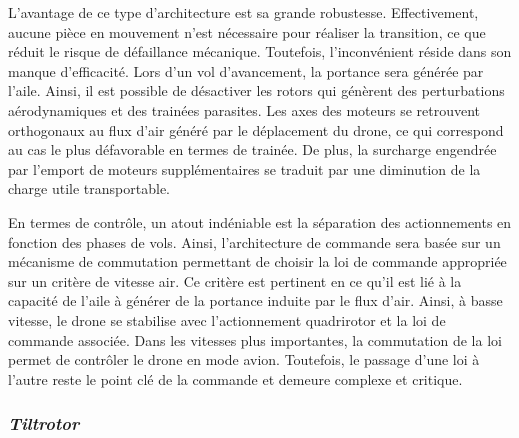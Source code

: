         L'avantage de ce type d'architecture est sa grande robustesse. Effectivement, aucune pièce en mouvement n'est nécessaire pour réaliser la transition, ce que réduit le risque de défaillance mécanique. Toutefois, l'inconvénient réside dans son manque d'efficacité. Lors d'un vol d'avancement, la portance sera générée par l'aile. Ainsi, il est possible de désactiver les rotors qui génèrent des perturbations aérodynamiques et des trainées parasites. Les axes des moteurs se retrouvent orthogonaux au flux d'air généré par le déplacement du drone, ce qui correspond au cas le plus défavorable en termes de trainée. De plus, la surcharge engendrée par l'emport de moteurs supplémentaires se traduit par une diminution de la charge utile transportable. 

        En termes de contrôle, un atout indéniable est la séparation des actionnements en fonction des phases de vols. Ainsi, l'architecture de commande sera basée sur un mécanisme de commutation permettant de choisir la loi de commande appropriée sur un critère de vitesse air. Ce critère est pertinent en ce qu'il est lié à la capacité de l'aile à générer de la portance induite par le flux d'air. Ainsi, à basse vitesse, le drone se stabilise avec l'actionnement quadrirotor et la loi de commande associée. Dans les vitesses plus importantes, la commutation de la loi permet de contrôler le drone en mode avion. Toutefois, le passage d'une loi à l'autre reste le point clé de la commande et demeure complexe et critique.

        \subsubsection*{\textit{Tiltrotor}}

